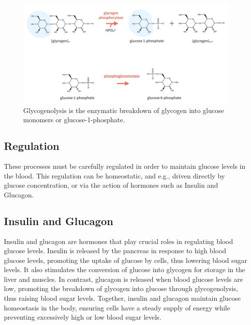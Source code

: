 \documentclass[]{tufte-handout}
\begin{document}
\begin{figure}

{\centering \includegraphics{img/glyogenolysis} 

}

\caption[Glycogenolysis is the enzymatic breakdown of glycogen into glucose monomers or glucose-1-phosphate]{Glycogenolysis is the enzymatic breakdown of glycogen into glucose monomers or glucose-1-phosphate. }\label{fig:unnamed-chunk-4}
\end{figure}

\subsection{Regulation}\label{regulation}

These processes must be carefully regulated in order to maintain glucose levels in the blood. This regulation can be homeostatic, and e.g., driven directly by glucose concentration, or via the action of hormones such as Insulin and Glucagon.

\subsection{Insulin and Glucagon}\label{insulin-and-glucagon}

Insulin and glucagon are hormones that play crucial roles in regulating blood glucose levels. Insulin is released by the pancreas in response to high blood glucose levels, promoting the uptake of glucose by cells, thus lowering blood sugar levels. It also stimulates the conversion of glucose into glycogen for storage in the liver and muscles. In contrast, glucagon is released when blood glucose levels are low, promoting the breakdown of glycogen into glucose through glycogenolysis, thus raising blood sugar levels. Together, insulin and glucagon maintain glucose homeostasis in the body, ensuring cells have a steady supply of energy while preventing excessively high or low blood sugar levels.
\end{document}
